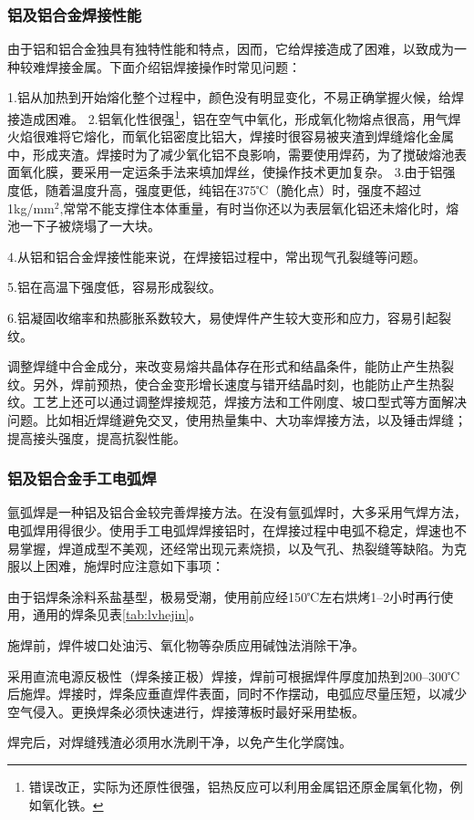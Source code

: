 \documentclass{ctexbook}
\begin{document}
\subsubsection{铝及铝合金焊接性能}
由于铝和铝合金独具有独特性能和特点，因而，它给焊接造成了困难，以致成为一种较难焊接金属。下面介绍铝焊接操作时常见问题：

1.铝从加热到开始熔化整个过程中，颜色没有明显变化，不易正确掌握火候，给焊接造成困难。
2.铝氧化性很强\footnote{错误改正，实际为还原性很强，铝热反应可以利用金属铝还原金属氧化物，例如氧化铁。}，铝在空气中氧化，形成氧化物熔点很高，用气焊火焰很难将它熔化，而氧化铝密度比铝大，焊接时很容易被夹渣到焊缝熔化金属中，形成夹渣。焊接时为了减少氧化铝不良影响，需要使用焊药，为了搅破熔池表面氧化膜，要采用一定运条手法来填加焊丝，使操作技术更加复杂。
3.由于铝强度低，随着温度升高，强度更低，纯铝在375℃（脆化点）时，强度不超过1kg/mm$^{2}$,常常不能支撑住本体重量，有时当你还以为表层氧化铝还未熔化时，熔池一下子被烧塌了一大块。

4.从铝和铝合金焊接性能来说，在焊接铝过程中，常出现气孔裂缝等问题。

5.铝在高温下强度低，容易形成裂纹。

6.铝凝固收缩率和热膨胀系数较大，易使焊件产生较大变形和应力，容易引起裂纹。

调整焊缝中合金成分，来改变易熔共晶体存在形式和结晶条件，能防止产生热裂纹。另外，焊前预热，使合金变形增长速度与错开结晶时刻，也能防止产生热裂纹。工艺上还可以通过调整焊接规范，焊接方法和工件刚度、坡口型式等方面解决问题。比如相近焊缝避免交叉，使用热量集中、大功率焊接方法，以及锤击焊缝；提高接头强度，提高抗裂性能。
\subsubsection{铝及铝合金手工电弧焊}	
氩弧焊是一种铝及铝合金较完善焊接方法。在没有氩弧焊时，大多采用气焊方法，电弧焊用得很少。使用手工电弧焊焊接铝时，在焊接过程中电弧不稳定，焊速也不易掌握，焊道成型不美观，还经常出现元素烧损，以及气孔、热裂缝等缺陷。为克服以上困难，施焊时应注意如下事项：

由于铝焊条涂料系盐基型，极易受潮，使用前应经150℃左右烘烤1--2小时再行使用，通用的焊条见表\ref{tab:lvhejin}。

施焊前，焊件坡口处油污、氧化物等杂质应用碱蚀法消除干净。

采用直流电源反极性（焊条接正极）焊接，焊前可根据焊件厚度加热到200--300℃后施焊。焊接时，焊条应垂直焊件表面，同时不作摆动，电弧应尽量压短，以减少空气侵入。更换焊条必须快速进行，焊接薄板时最好采用垫板。

焊完后，对焊缝残渣必须用水洗刷干净，以免产生化学腐蚀。
\end{document}
